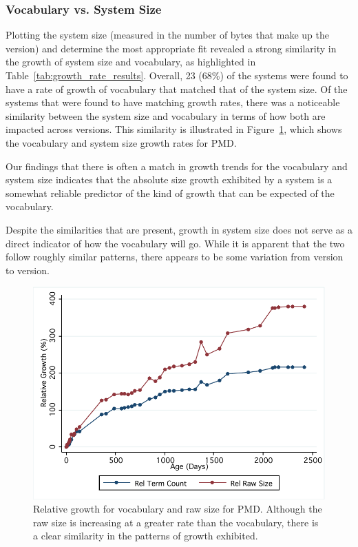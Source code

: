 \subsubsection{Vocabulary vs. System Size} %
\label{ssub:vocabulary_vs_system_size}

Plotting the system size (measured in the number of bytes that make up the version) and determine the most appropriate fit revealed a strong similarity in the growth of system size and vocabulary, as highlighted in Table~\ref{tab:growth_rate_results}. Overall, 23 (68\%) of the systems were found to have a rate of growth of vocabulary that matched that of the system size. Of the systems that were found to have matching growth rates, there was a noticeable similarity between the system size and vocabulary in terms of how both are impacted across versions. This similarity is illustrated in Figure~\ref{fig:comparative_growth_pmd}, which shows the vocabulary and system size growth rates for PMD.

Our findings that there is often a match in growth trends for the vocabulary and system size indicates that the absolute size growth exhibited by a system is a somewhat reliable predictor of the kind of growth that can be expected of the vocabulary.

Despite the similarities that are present, growth in system size does not serve as a direct indicator of how the vocabulary will go. While it is apparent that the two follow roughly similar patterns, there appears to be some variation from version to version.

\begin{figure}[t]
\centering
\includegraphics[width=\textwidth]{Figures/Vocab-PMDComparativeGrowth.pdf}
\caption{Relative growth for vocabulary and raw size for PMD. Although the raw size is increasing at a greater rate than the vocabulary, there is a clear similarity in the patterns of growth exhibited.}
\label{fig:comparative_growth_pmd}
\end{figure}

